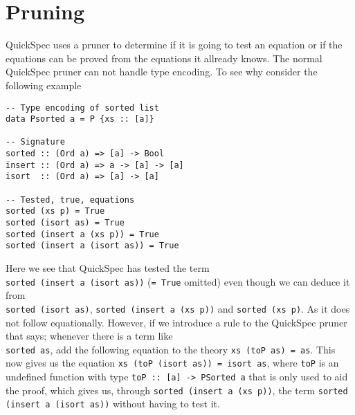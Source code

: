 \section{Pruning}
QuickSpec uses a pruner to determine if
it is going to test an equation or if the equations
can be proved from the equations it allready knows.
The normal QuickSpec pruner can not handle type encoding.
To see why consider the following example
\begin{verbatim}
-- Type encoding of sorted list
data Psorted a = P {xs :: [a]}

-- Signature
sorted :: (Ord a) => [a] -> Bool
insert :: (Ord a) => a -> [a] -> [a]
isort  :: (Ord a) => [a] -> [a]

-- Tested, true, equations
sorted (xs p) = True
sorted (isort as) = True
sorted (insert a (xs p)) = True
sorted (insert a (isort as)) = True
\end{verbatim}
Here we see that QuickSpec has tested the term
\\\texttt{sorted (insert a (isort as))} (\texttt{= True} omitted)
even though we can deduce it from
\\\texttt{sorted (isort as)},
\texttt{sorted (insert a (xs p))} and
\texttt{sorted (xs p)}. As it does not follow
equationally. However, if we introduce
a rule to the QuickSpec pruner that says;
whenever there is a term like \\\texttt{sorted as},
add the following equation to the theory
\texttt{xs (toP as) = as}. This now gives us
the equation \texttt{xs (toP (isort as)) = isort as},
where \texttt{toP} is an undefined function with type
\texttt{toP :: [a] -> PSorted a} that is only used to aid the proof,
which gives us, through \texttt{sorted (insert a (xs p))},
the term \texttt{sorted (insert a (isort as))} without
having to test it.
